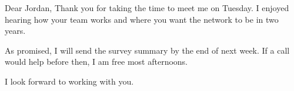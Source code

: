 \documentclass[cover]{jupiter-letter}
\begin{document}
\begin{jpletter}{Dear Jordan,}
Thank you for taking the time to meet me on Tuesday. I enjoyed hearing how your team works and where you want the network to be in two years.

As promised, I will send the survey summary by the end of next week. If a call would help before then, I am free most afternoons.

I look forward to working with you.
\end{jpletter}
\end{document}
